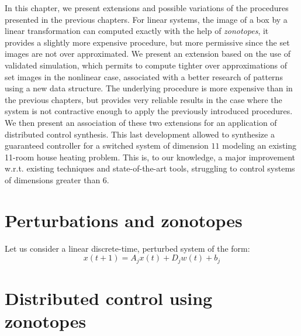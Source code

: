 \graphicspath{{part_3/figures}{part_3/figures/}}


In this chapter, we present extensions and possible variations of
the procedures presented in the previous chapters.
For linear systems, the image of a box by a linear transformation
can computed exactly with the help of {\em zonotopes}, it provides a slightly more 
expensive procedure, but more permissive since the set images are not 
over approximated. 
We present an extension based on the use of validated simulation,
which permits to compute tighter over approximations of set images in the nonlinear case,
associated with a better research of patterns using a new data structure. The underlying 
procedure is more expensive than in the previous chapters, but provides very reliable results 
in the case where the system is not contractive enough to apply the previously introduced procedures.
We then present an association of these two extensions for an application of
distributed control synthesis. This last development allowed to synthesize a guaranteed controller
for a switched system of dimension $11$ modeling an existing 11-room house heating problem. This is,
to our knowledge, a major improvement w.r.t. existing techniques and state-of-the-art tools,
struggling to control systems of dimensions greater than $6$.


\section{Perturbations and zonotopes}

Let us consider a linear discrete-time, perturbed system of the form:
\begin{equation}
 x(t+1) = A_j x(t) + D_j w(t) + b_j 
 \label{eq:linear_pert_sys}
\end{equation}



\section{Distributed control using zonotopes}
